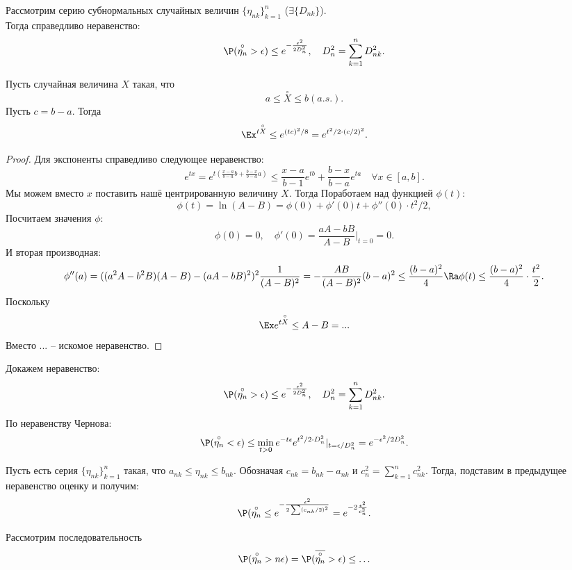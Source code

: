 Рассмотрим серию субнормальных случайных величин $\{\eta_{nk}\}_{k = 1}^n$ ($\exists \{D_{nk}\}$). \\
Тогда справедливо неравенство:
\[
    \P(\overset{\circ}{\eta_n} > \epsilon) \leq e^{-\frac{\epsilon^2}{2D^2_n}}, \quad D_n^2 = \sum\limits_{k = 1}^{n} D^2_{nk}.
\]
\begin{theorem}
    Пусть случайная величина $X$ такая, что
    \[
        a \leq \overset{\circ}{X} \leq b (a.s.).
    \]
    Пусть $c = b - a$.
    Тогда
    \[
        \Ex^{t \overset{\circ}{X}} \leq e^{(tc)^2/8} = e^{t^2/2 \cdot (c/2)^2}.
    \]
\end{theorem}
\begin{proof}
    Для экспоненты справедливо следующее неравенство:
    \[
        e^{tx} = e^{t(\frac{x - a}{b - a}b + \frac{b - x}{b - a}a)} \leq \dfrac{x - a}{b - 1}e^{tb} + \dfrac{b - x}{b - a}e^{ta} \quad \forall x \in [a, b].
    \]
    Мы можем вместо $x$ поставить нашё центрированную величину $X$.
    Тогда
    Поработаем над функцией $\phi(t)$:
    \[
        \phi(t) = \ln (A - B) = \phi(0) + \phi'(0)t + \phi''(0)\cdot t^2/2,
    \]
    Посчитаем значения $\phi$:
    \[
        \phi(0) = 0, \quad \phi'(0) = \dfrac{aA - bB}{A - B}\bigr|_{t = 0} = 0.
    \]
    И вторая производная:
    \[
        \phi''(a) = ((a^2 A - b^2 B)(A - B) - (a A - b B)^2)^2 \dfrac{1}{(A - B)^2} = -\dfrac{AB}{(A - B)^2}(b - a)^2 \leq \dfrac{(b - a)^2}{4} \Ra \phi(t) \leq \dfrac{(b - a)^2}{4} \cdot \dfrac{t^2}{2}.
    \]
    Поскольку
    \[\Ex e^{t \overset{\circ}{X}} \leq A - B = ...\]
    Вместо ... -- искомое неравенство.
\end{proof}
Докажем неравенство:
\[
    \P(\overset{\circ}{\eta_n} > \epsilon) \leq e^{-\frac{\epsilon^2}{2D^2_n}}, \quad D_n^2 = \sum\limits_{k = 1}^{n} D^2_{nk}.
\]
По неравенству Чернова:
\[
    \P(\overset{\circ}{\eta_n} < \epsilon) \leq \min\limits_{t > 0} e^{-t \epsilon} e^{t^2/2 \cdot D_n^2}|_{t = \epsilon/D_n^2} = e^{-\epsilon^2/2D_n^2}.
\]
\begin{theorem}[Хёфтинг]
    Пусть есть серия $\{\eta_{nk}\}_{k = 1}^{n}$ такая, что $a_{nk} \leq \eta_{nk} \leq b_{nk}$. Обозначая $c_{nk} = b_{nk} - a_{nk}$ и $c^2_n = \sum\limits_{k = 1}^{n} c_{nk}^2$.
    Тогда, подставим в предыдущее неравенство оценку и получим:
    \[
        \P(\overset{\circ}{\eta_n} \leq e^{-\frac{\epsilon^2}{2 \sum (c_{nk}/2)^2}} = e^{-2\frac{\epsilon^2}{c_n^2}}.
    \]
\end{theorem}
Рассмотрим последовательность
\[
    \P(\overset{\circ}{\eta_n} > n \epsilon) = \P(\overline{\overset{\circ}{\eta_n}} > \epsilon) \leq \ldots
\]
